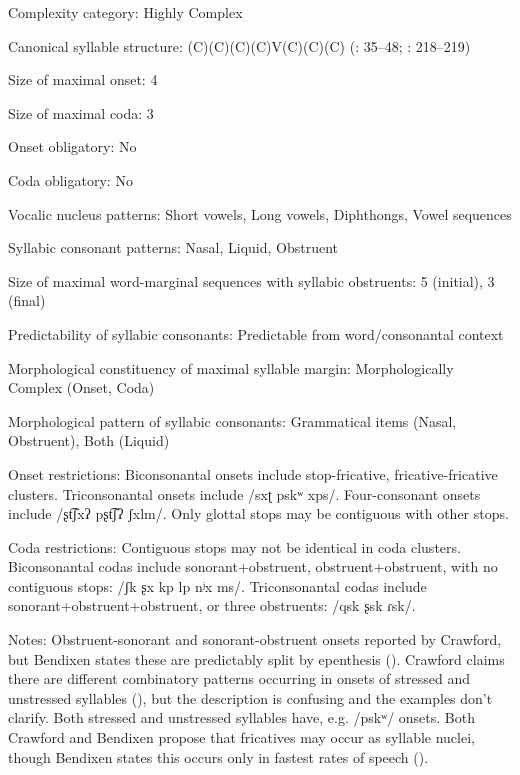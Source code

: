 {\begin{appendixdesc}
\item[Complexity category:] Highly Complex

\item[Canonical syllable structure:] (C)(C)(C)(C)V(C)(C)(C) (\citealt{Crawford1966}: 35--48; \citealt{Bendixen1980}: 218--219)

\item[Size of maximal onset:] 4

\item[Size of maximal coda:] 3

\item[Onset obligatory:] No

\item[Coda obligatory:] No

\item[Vocalic nucleus patterns:] Short vowels, Long vowels, Diphthongs, Vowel sequences

\item[Syllabic consonant patterns:] Nasal, Liquid, Obstruent

\item[Size of maximal word-marginal sequences with syllabic obstruents:] 5 (initial), 3 (final)

\item[Predictability of syllabic consonants:] Predictable from word/consonantal context

\item[Morphological constituency of maximal syllable margin:] Morphologically Complex (Onset, Coda)

\item[Morphological pattern of syllabic consonants:] Grammatical items (Nasal, Obstruent), Both (Liquid)

\item[Onset restrictions:] Biconsonantal onsets include stop-fricative, fricative-fricative clusters. Triconsonantal onsets include /sxʈ pskʷ xps/. Four-consonant onsets include /ʂt͡ʃxʔ pʂt͡ʃʔ ʃxlm/. Only glottal stops may be contiguous with other stops.

\item[Coda restrictions:] Contiguous stops may not be identical in coda clusters. Biconsonantal codas include sonorant+obstruent, obstruent+obstruent, with no contiguous stops: /ʃk ʂx kp lp nʲx ms/. Triconsonantal codas include sonorant+obstruent+obstruent, or three obstruents: /qsk ʂsk ɾsk/.

\item[Notes:] Obstruent-sonorant and sonorant-obstruent onsets reported by Crawford, but Bendixen states these are predictably split by epenthesis (\citeyear[219--220]{Bendixen1980}). Crawford claims there are different combinatory patterns occurring in onsets of stressed and unstressed syllables (\citeyear[35--37]{Crawford1966}), but the description is confusing and the examples don’t clarify. Both stressed and unstressed syllables have, e.g. /pskʷ/ onsets. Both Crawford and Bendixen propose that fricatives may occur as syllable nuclei, though Bendixen states this occurs only in fastest rates of speech (\citeyear[34]{Bendixen1980}).
\end{appendixdesc}
}
